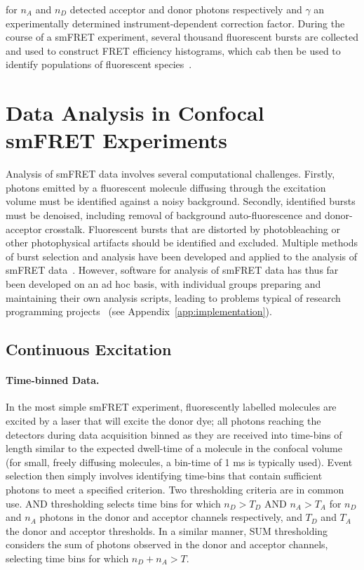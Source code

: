 for $n_A$ and $n_D$ detected acceptor and donor photons respectively and $\gamma$ an experimentally determined instrument-dependent correction factor. During the course of a smFRET experiment, several thousand fluorescent bursts are collected and used to construct FRET efficiency histograms, which cab then be used to identify populations of fluorescent species~\cite{ha96}.

\section{Data Analysis in Confocal smFRET Experiments}
Analysis of smFRET data involves several computational challenges. Firstly, photons emitted by a fluorescent molecule diffusing through the excitation volume must be identified against a noisy background. Secondly, identified bursts must be denoised, including removal of background auto-fluorescence and donor-acceptor crosstalk. Fluorescent bursts that are distorted by photobleaching or other photophysical artifacts should be identified and excluded. Multiple methods of burst selection and analysis have been developed and applied to the analysis of smFRET data~\cite{weiss00, deniz01, gell06, nir06, kapanidis05, muller05, doose07, kudryavtsev2012, eggeling01}. However, software for analysis of smFRET data has thus far been developed on an ad hoc basis, with individual groups preparing and maintaining their own analysis scripts, leading to problems typical of research programming projects~\cite{wilson06, merali10} (see Appendix~\ref{app:implementation}).


\subsection{Continuous Excitation}
\paragraph{Time-binned Data.}
\label{par:time-binned_data}
In the most simple smFRET experiment, fluorescently labelled molecules are excited by a laser that will excite the donor dye; all photons reaching the detectors during data acquisition binned as they are received into time-bins of length similar to the expected dwell-time of a molecule in the confocal volume (for small, freely diffusing molecules, a bin-time of 1 ms is typically used). Event selection then simply involves identifying time-bins that contain sufficient photons to meet a specified criterion. Two thresholding criteria are in common use. AND thresholding selects time bins for which $n_D > T_D$ AND $n_A > T_A$ for $n_D$ and $n_A$ photons in the donor and acceptor channels respectively, and $T_D$ and $T_A$ the donor and acceptor thresholds. In a similar manner, SUM thresholding considers the sum of photons observed in the donor and acceptor channels, selecting time bins for which $n_D + n_A > T$.

